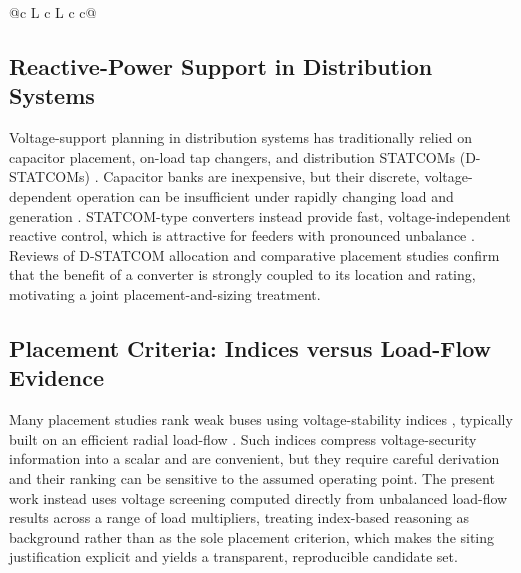 \documentclass{ieeeaccess}
\begin{document}
\begin{table}[!t]
\begin{tabularx}{\textwidth}{@{}c L c L c c@{}}
\bottomrule
{} \\
\end{tabularx}
\end{table}

\subsection{Reactive-Power Support in Distribution Systems}
Voltage-support planning in distribution systems has traditionally relied on
capacitor placement, on-load tap changers, and distribution STATCOMs
(D-STATCOMs) \cite{hingorani2000facts,edris1997facts,singh2009statcom}.
Capacitor banks are inexpensive, but their discrete, voltage-dependent operation
can be insufficient under rapidly changing load and generation
\cite{ng2000capacitor}. STATCOM-type converters instead provide fast,
voltage-independent reactive control, which is attractive for feeders with
pronounced unbalance \cite{singh2009statcom}. Reviews of D-STATCOM allocation
\cite{sirjani2017dstatcom} and comparative placement studies
\cite{taher2014dstatcom,devi2014dstatcom} confirm that the benefit of a
converter is strongly coupled to its location and rating, motivating a joint
placement-and-sizing treatment.

\subsection{Placement Criteria: Indices versus Load-Flow Evidence}
Many placement studies rank weak buses using voltage-stability indices
\cite{chakravorty2001vsi}, typically built on an efficient radial load-flow
\cite{haque1996loadflow}. Such indices compress
voltage-security information into a scalar and are convenient, but they require
careful derivation and their ranking can be sensitive to the assumed operating
point. The present work instead uses voltage screening computed directly from
unbalanced load-flow results across a range of load multipliers, treating
index-based reasoning as background rather than as the sole placement criterion,
which makes the siting justification explicit and yields a transparent,
reproducible candidate set.
\end{document}
